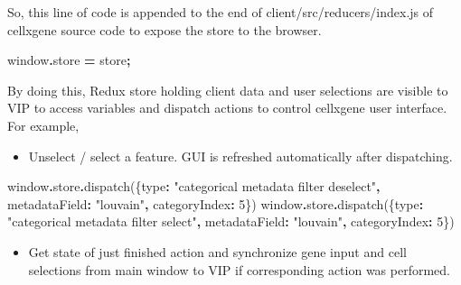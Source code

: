 \documentclass[
]{article}
\newenvironment{Shaded}{\begin{snugshade}}{\end{snugshade}}
\newcommand{\AttributeTok}[1]{\textcolor[rgb]{0.77,0.63,0.00}{#1}}
\newcommand{\BuiltInTok}[1]{#1}
\newcommand{\DataTypeTok}[1]{\textcolor[rgb]{0.13,0.29,0.53}{#1}}
\newcommand{\DecValTok}[1]{\textcolor[rgb]{0.00,0.00,0.81}{#1}}
\newcommand{\FunctionTok}[1]{\textcolor[rgb]{0.00,0.00,0.00}{#1}}
\newcommand{\NormalTok}[1]{#1}
\newcommand{\OperatorTok}[1]{\textcolor[rgb]{0.81,0.36,0.00}{\textbf{#1}}}
\newcommand{\StringTok}[1]{\textcolor[rgb]{0.31,0.60,0.02}{#1}}
\providecommand{\tightlist}{%
  \setlength{\itemsep}{0pt}\setlength{\parskip}{0pt}}
\begin{document}
So, this line of code is appended to the end of client/src/reducers/index.js of cellxgene source code to expose the store to the browser.

\begin{Shaded}
\begin{Highlighting}[]
\BuiltInTok{window}\OperatorTok{.}\AttributeTok{store} \OperatorTok{=}\NormalTok{ store}\OperatorTok{;}
\end{Highlighting}
\end{Shaded}

By doing this, Redux store holding client data and user selections are visible to VIP to access variables and dispatch actions to control cellxgene user interface. For example,

\begin{itemize}
\tightlist
\item
  Unselect / select a feature. GUI is refreshed automatically after dispatching.
\end{itemize}

\begin{Shaded}
\begin{Highlighting}[]
\BuiltInTok{window}\OperatorTok{.}\AttributeTok{store}\OperatorTok{.}\FunctionTok{dispatch}\NormalTok{(\{}\DataTypeTok{type}\OperatorTok{:} \StringTok{"categorical metadata filter deselect"}\OperatorTok{,} \DataTypeTok{metadataField}\OperatorTok{:} \StringTok{"louvain"}\OperatorTok{,} \DataTypeTok{categoryIndex}\OperatorTok{:} \DecValTok{5}\NormalTok{\})}
\BuiltInTok{window}\OperatorTok{.}\AttributeTok{store}\OperatorTok{.}\FunctionTok{dispatch}\NormalTok{(\{}\DataTypeTok{type}\OperatorTok{:} \StringTok{"categorical metadata filter select"}\OperatorTok{,} \DataTypeTok{metadataField}\OperatorTok{:} \StringTok{"louvain"}\OperatorTok{,} \DataTypeTok{categoryIndex}\OperatorTok{:} \DecValTok{5}\NormalTok{\})}
\end{Highlighting}
\end{Shaded}

\begin{itemize}
\tightlist
\item
  Get state of just finished action and synchronize gene input and cell selections from main window to VIP if corresponding action was performed.
\end{itemize}
\end{document}
